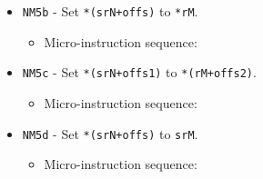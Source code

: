 \documentclass{article}
\def\specialtoaddr#1{\Verb|#1102| - output \Verb|sr#1| to addr bus}
\def\pkptrout{\Verb|0202| - output *\Verb|pk| to data bus}
\def\datatooffs{\Verb|4402| - write to \Verb|offs| from data bus}
\def\incrementpk{\Verb|0502| - increment \Verb|pk|}
\def\writeRAMo{\Verb|0104| - write data bus to *(addr bus+\Verb|offs|)}
\def\echodatalong{\Verb|0025| - echo data bus to itself for 3 cycles}
\def\done{\Verb|fffe| - end instruction}
\begin{document}
\begin{itemize}
    \item \Verb|NM5b| - Set \Verb|*(srN+offs)| to \Verb|*rM|.
    \begin{itemize}
        \item Micro-instruction sequence:
    \end{itemize}
    
    \item \Verb|NM5c| - Set \Verb|*(srN+offs1)| to \Verb|*(rM+offs2)|.
    \begin{itemize}
        \item Micro-instruction sequence:
    \end{itemize}

    \item \Verb|NM5d| - Set \Verb|*(srN+offs)| to \Verb|srM|.
    \begin{itemize}
        \item Micro-instruction sequence:
    \end{itemize}
    

\end{itemize}
\end{document}
